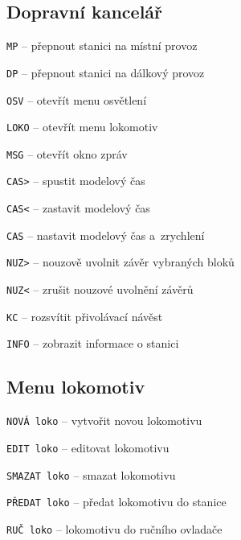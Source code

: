 \documentclass[12pt,a4paper,landscape]{article}
\begin{document}
\begin{multicols}{3}

\section{Dopravní kancelář}
\begin{compactitem}
	\item \texttt{MP} -- přepnout stanici na místní provoz
	\item \texttt{DP} -- přepnout stanici na dálkový provoz
	\item \texttt{OSV} -- otevřít menu osvětlení
	\item \texttt{LOKO} -- otevřít menu lokomotiv
	\item \texttt{MSG} -- otevřít okno zpráv
	\item \texttt{CAS>} -- spustit modelový čas
	\item \texttt{CAS<} -- zastavit modelový čas
	\item \texttt{CAS} -- nastavit modelový čas	a~zrychlení
	\item \texttt{NUZ>} -- nouzově uvolnit závěr vybraných bloků
	\item \texttt{NUZ<} -- zrušit nouzové uvolnění závěrů
	\item \texttt{KC} -- rozsvítit přivolávací návěst
	\item \texttt{INFO} -- zobrazit informace o stanici
\end{compactitem}

\subsection{Menu lokomotiv}
\begin{compactitem}
	\item \texttt{NOVÁ loko} -- vytvořit novou lokomotivu
	\item \texttt{EDIT loko} -- editovat lokomotivu
	\item \texttt{SMAZAT loko} -- smazat lokomotivu
	\item \texttt{PŘEDAT loko} -- předat lokomotivu do stanice
	\item \texttt{RUČ loko} -- lokomotivu do ručního ovladače
\end{compactitem}


\end{multicols}
\end{document}
